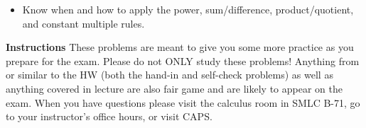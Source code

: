 \documentclass[11pt]{article}
\begin{document}
\begin{itemize}
\item Know when and how to apply the power, sum/difference, product/quotient, and constant multiple rules.



\end{itemize}

\vspace{0.2in}

{\bf Instructions} These problems are meant to give you some more practice as you prepare for the exam. Please do not ONLY study these problems! Anything from or similar to the HW (both the hand-in and self-check problems) as well as anything covered in lecture are also fair game and are likely to appear on the exam. When you have questions please visit the calculus room in SMLC B-71, go to your instructor's office hours, or visit CAPS.  
\end{document}
